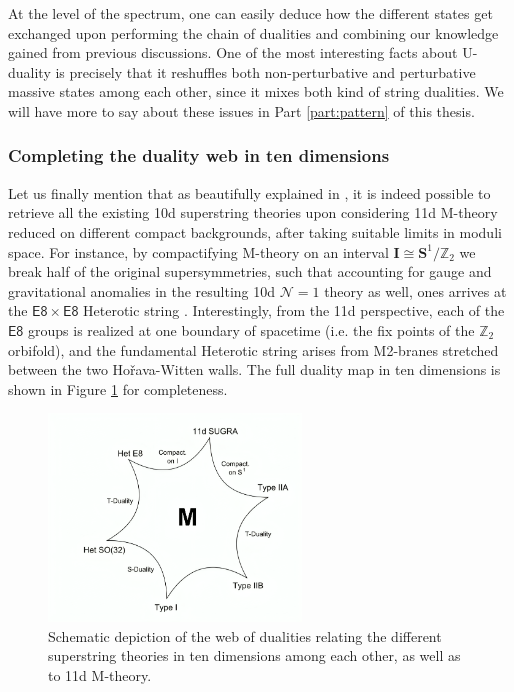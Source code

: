 At the level of the spectrum, one can easily deduce how the different states get exchanged upon performing the chain of dualities and combining our knowledge gained from previous discussions. One of the most interesting facts about U-duality is precisely that it reshuffles both non-perturbative and perturbative massive states among each other, since it mixes both kind of string dualities. We will have more to say about these issues in Part \ref{part:pattern} of this thesis.

\subsubsection*{Completing the duality web in ten dimensions}

Let us finally mention that as beautifully explained in \cite{Witten:1995ex}, it is indeed possible to retrieve all the existing 10d superstring theories upon considering 11d M-theory reduced on different compact backgrounds, after taking suitable limits in moduli space. For instance, by compactifying M-theory on an interval $\mathbf{I} \cong \mathbf{S}^1/\mathbb{Z}_2$ we break half of the original supersymmetries, such that accounting for gauge and gravitational anomalies in the resulting 10d $\mathcal{N}=1$ theory as well, ones arrives at the $\mathsf{E8}\times \mathsf{E8}$ Heterotic string \cite{Horava:1995qa,Horava:1996ma}. Interestingly, from the 11d perspective, each of the $\mathsf{E8}$ groups is realized at one boundary of spacetime (i.e. the fix points of the $\mathbb{Z}_2$ orbifold), and the fundamental Heterotic string arises from M2-branes stretched between the two Ho\v rava-Witten walls. The full duality map in ten dimensions is shown in Figure \ref{fig:dualitystar} for completeness.

\begin{figure}[htb]
\begin{center}
\includegraphics[width=0.6\textwidth]{Duality_star.png}
\caption{\small Schematic depiction of the web of dualities relating the different superstring theories in ten dimensions among each other, as well as to 11d M-theory.}
\label{fig:dualitystar}
\end{center}
\end{figure}

